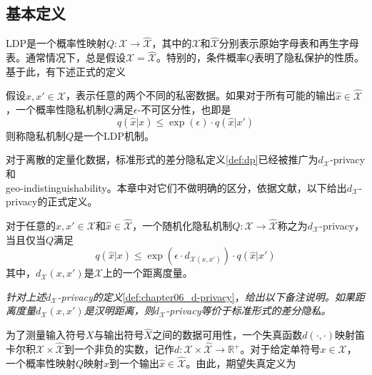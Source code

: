 \subsection{基本定义}\label{sec:chapter06_basic_definitions}

LDP\cite{duchi2013local}是一个概率性映射$Q:\mathcal{X}\rightarrow \hat{\mathcal{X}}$，其中的$\mathcal{X}$和$\hat{\mathcal{X}}$分别表示原始字母表和再生字母表。通常情况下，总是假设$\mathcal{X}=\hat{\mathcal{X}}$。特别的，条件概率$Q$表明了隐私保护的性质。基于此，有下述正式的定义\cite{kasiviswanathan2011what}
\begin{definition}\label{def:chapter06_LDP}
	假设$x,x' \in \mathcal{X}$，表示任意的两个不同的私密数据。如果对于所有可能的输出$\hat{x} \in \hat{\mathcal{X}}$，一个概率性隐私机制$Q$满足$\epsilon$-不可区分性，也即是
	\begin{equation}
		q(\hat{x}|x) \leq \exp(\epsilon)\cdot q(\hat{x}|x')
	\end{equation}
则称隐私机制$Q$是一个LDP机制。
\end{definition}

对于离散的定量化数据，标准形式的差分隐私定义\ref{def:dp}已经被推广为$d_{\mathcal{X}}$-privacy\cite{chatzikokolakis2013broadening}和\\geo-indistinguishability\cite{andres2013geo,bordenabe2014optimal}。本章中对它们不做明确的区分，依据文献，以下给出$d_{\mathcal{X}}$-privacy的正式定义。

\begin{definition}\label{def:chapter06_d-privacy}
	对于任意的$x,x' \in \mathcal{X}$和$\hat{x} \in \hat{\mathcal{X}}$，一个随机化隐私机制$Q:\mathcal{X}\rightarrow \hat{\mathcal{X}}$称之为$d_{\mathcal{X}}$-privacy，当且仅当$Q$满足
	\begin{equation}
	q(\hat{x}|x) \leq \exp(\epsilon \cdot d_{\mathcal{X}(x,x')}) \cdot q(\hat{x}|x')
	\end{equation}
其中，$d_{\mathcal{X}}(x,x')$是$\mathcal{X}$上的一个距离度量。
\end{definition}

\begin{remark}{\em
针对上述$d_{\mathcal{X}}$-privacy的定义}\ref{def:chapter06_d-privacy}，{\em 给出以下备注说明。如果距离度量$d_{\mathcal{X}}(x,x')$是汉明距离，则$d_{\mathcal{X}}$-privacy等价于标准形式的差分隐私。}
\end{remark}

为了测量输入符号$X$与输出符号$\hat{X}$之间的数据可用性，一个失真函数$d(\cdot,\cdot)$映射笛卡尔积$\mathcal{X}\times \hat{\mathcal{X}}$到一个非负的实数，记作$d:\mathcal{X}\times \hat{\mathcal{X}} \rightarrow \mathbb{R}^{+}$。对于给定单符号$x \in \mathcal{X}$，一个概率性映射$Q$映射$x$到一个输出$\hat{x} \in \hat{\mathcal{X}}$。由此，期望失真定义为

